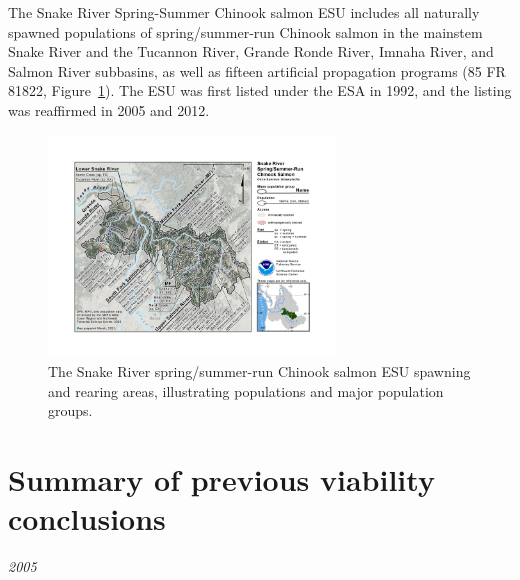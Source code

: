 \documentclass[
  letterpaper,
  oneside,
  open=any]{scrbook}
\begin{document}
The Snake River Spring-Summer Chinook salmon ESU includes all naturally
spawned populations of spring/summer-run Chinook salmon in the mainstem
Snake River and the Tucannon River, Grande Ronde River, Imnaha River,
and Salmon River subbasins, as well as fifteen artificial propagation
programs (85 FR 81822, Figure~\ref{fig-SnR-SS-spawning-areas}). The ESU
was first listed under the ESA in 1992, and the listing was reaffirmed
in 2005 and 2012.

\begin{figure}

{\centering \includegraphics[width=3in,height=\textheight]{content/Interior_Columbia/../../media/image22.jpg}

}

\caption{\label{fig-SnR-SS-spawning-areas}The Snake River
spring/summer-run Chinook salmon ESU spawning and rearing areas,
illustrating populations and major population groups.}

\end{figure}

\hypertarget{summary-of-previous-viability-conclusions-2}{%
\section{Summary of previous viability
conclusions}\label{summary-of-previous-viability-conclusions-2}}

\emph{2005}
\end{document}

